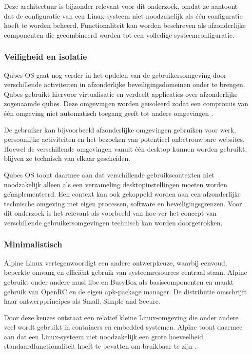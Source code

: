\documentclass{hogent-article}
\begin{document}
Deze architectuur is bijzonder relevant voor dit onderzoek, omdat ze aantoont dat de configuratie van een Linux-systeem niet noodzakelijk als één configuratie hoeft te worden beheerd. Functionaliteit kan worden beschreven als afzonderlijke componenten die gecombineerd worden tot een volledige systeemconfiguratie.

\subsubsection{Veiligheid en isolatie}
\label{sssec:veiligheid}

Qubes OS gaat nog verder in het opdelen van de gebruikersomgeving door verschillende activiteiten in afzonderlijke beveiligingsdomeinen onder te brengen. Qubes gebruikt hiervoor virtualisatie en verdeelt applicaties over afzonderlijke zogenaamde qubes. Deze omgevingen worden geïsoleerd zodat een compromis van één omgeving niet automatisch toegang geeft tot andere omgevingen \autocite{Qubes}.

De gebruiker kan bijvoorbeeld afzonderlijke omgevingen gebruiken voor werk, persoonlijke activiteiten en het bezoeken van potentieel onbetrouwbare websites. Hoewel de verschillende omgevingen vanuit één desktop kunnen worden gebruikt, blijven ze technisch van elkaar gescheiden.

Qubes OS toont daarmee aan dat verschillende gebruikscontexten niet noodzakelijk alleen als een verzameling desktopinstellingen moeten worden geïmplementeerd. Een context kan ook gekoppeld worden aan een afzonderlijke technische omgeving met eigen processen, software en beveiligingsgrenzen. Voor dit onderzoek is het relevant als voorbeeld van hoe ver het concept van verschillende gebruikersomgevingen technisch kan worden doorgetrokken.

\subsubsection{Minimalistisch}
\label{sssec:minimalistisch}

Alpine Linux vertegenwoordigt een andere ontwerpkeuze, waarbij eenvoud, beperkte omvang en efficiënt gebruik van systeemresources centraal staan. Alpine gebruikt onder andere musl libc en BusyBox als basiscomponenten en maakt gebruik van OpenRC en de eigen apk-package manager. De distributie omschrijft haar ontwerpprincipes als Small, Simple and Secure.

Door deze keuzes ontstaat een relatief kleine Linux-omgeving die onder andere veel wordt gebruikt in containers en embedded systemen. Alpine toont daarmee aan dat een Linux-systeem niet noodzakelijk een grote hoeveelheid standaardfunctionaliteit hoeft te bevatten om bruikbaar te zijn \autocite{Alpine}.
\end{document}
